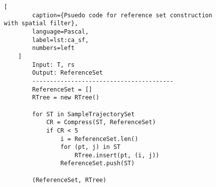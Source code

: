 \begin{figure}[t]
    \begin{lstlisting}[
        caption={Psuedo code for reference set construction with spatial filter},
        language=Pascal,
        label=lst:ca_sf,
        numbers=left
    ]
        Input: T, rs
        Output: ReferenceSet
        ----------------------------------------
        ReferenceSet = []
        RTree = new RTree()

        for ST in SampleTrajectorySet
            CR = Compress(ST, ReferenceSet)
            if CR < 5 
                i = ReferenceSet.len()
                for (pt, j) in ST
                    RTree.insert(pt, (i, j))
                ReferenceSet.push(ST)

        (ReferenceSet, RTree)
    \end{lstlisting}
\end{figure}